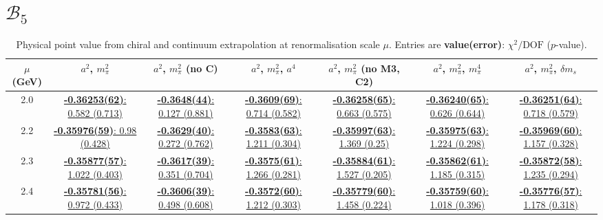 \documentclass[12pt]{extarticle}
\begin{document}
\section{$\mathcal{B}_5$}
\begin{table}[h!]
\begin{center}
\begin{tabular}{|c|c|c|c|c|c|c|}
\hline
$\mu$ (GeV) & $a^2$, $m_\pi^2$& $a^2$, $m_\pi^2$ (no C)& $a^2$, $m_\pi^2$, $a^4$& $a^2$, $m_\pi^2$ (no M3, C2)& $a^2$, $m_\pi^2$, $m_\pi^4$& $a^2$, $m_\pi^2$, $\delta m_s$\\
\hline
2.0& \hyperlink{TT/NPR/bag_a2m2_20.pdf.1}{\textbf{-0.36253(62)}: 0.582 (0.713)} & \hyperlink{TT/NPR/bag_a2m2noC_20.pdf.1}{\textbf{-0.3648(44)}: 0.127 (0.881)} & \hyperlink{TT/NPR/bag_a2a4m2_20.pdf.1}{\textbf{-0.3609(69)}: 0.714 (0.582)} & \hyperlink{TT/NPR/bag_a2m2mcut_20.pdf.1}{\textbf{-0.36258(65)}: 0.663 (0.575)} & \hyperlink{TT/NPR/bag_a2m2m4_20.pdf.1}{\textbf{-0.36240(65)}: 0.626 (0.644)} & \hyperlink{TT/NPR/bag_a2m2delm_20.pdf.1}{\textbf{-0.36251(64)}: 0.718 (0.579)}\\
2.2& \hyperlink{TT/NPR/bag_a2m2_22.pdf.1}{\textbf{-0.35976(59)}: 0.98 (0.428)} & \hyperlink{TT/NPR/bag_a2m2noC_22.pdf.1}{\textbf{-0.3629(40)}: 0.272 (0.762)} & \hyperlink{TT/NPR/bag_a2a4m2_22.pdf.1}{\textbf{-0.3583(63)}: 1.211 (0.304)} & \hyperlink{TT/NPR/bag_a2m2mcut_22.pdf.1}{\textbf{-0.35997(63)}: 1.369 (0.25)} & \hyperlink{TT/NPR/bag_a2m2m4_22.pdf.1}{\textbf{-0.35975(63)}: 1.224 (0.298)} & \hyperlink{TT/NPR/bag_a2m2delm_22.pdf.1}{\textbf{-0.35969(60)}: 1.157 (0.328)}\\
2.3& \hyperlink{TT/NPR/bag_a2m2_23.pdf.1}{\textbf{-0.35877(57)}: 1.022 (0.403)} & \hyperlink{TT/NPR/bag_a2m2noC_23.pdf.1}{\textbf{-0.3617(39)}: 0.351 (0.704)} & \hyperlink{TT/NPR/bag_a2a4m2_23.pdf.1}{\textbf{-0.3575(61)}: 1.266 (0.281)} & \hyperlink{TT/NPR/bag_a2m2mcut_23.pdf.1}{\textbf{-0.35884(61)}: 1.527 (0.205)} & \hyperlink{TT/NPR/bag_a2m2m4_23.pdf.1}{\textbf{-0.35862(61)}: 1.185 (0.315)} & \hyperlink{TT/NPR/bag_a2m2delm_23.pdf.1}{\textbf{-0.35872(58)}: 1.235 (0.294)}\\
2.4& \hyperlink{TT/NPR/bag_a2m2_24.pdf.1}{\textbf{-0.35781(56)}: 0.972 (0.433)} & \hyperlink{TT/NPR/bag_a2m2noC_24.pdf.1}{\textbf{-0.3606(39)}: 0.498 (0.608)} & \hyperlink{TT/NPR/bag_a2a4m2_24.pdf.1}{\textbf{-0.3572(60)}: 1.212 (0.303)} & \hyperlink{TT/NPR/bag_a2m2mcut_24.pdf.1}{\textbf{-0.35779(60)}: 1.458 (0.224)} & \hyperlink{TT/NPR/bag_a2m2m4_24.pdf.1}{\textbf{-0.35759(60)}: 1.018 (0.396)} & \hyperlink{TT/NPR/bag_a2m2delm_24.pdf.1}{\textbf{-0.35776(57)}: 1.178 (0.318)}\\
\hline
\end{tabular}
\caption{Physical point value from chiral and continuum extrapolation at renormalisation scale $\mu$. Entries are \textbf{value(error)}: $\chi^2/\text{DOF}$ ($p$-value).}
\end{center}
\end{table}
\end{document}
